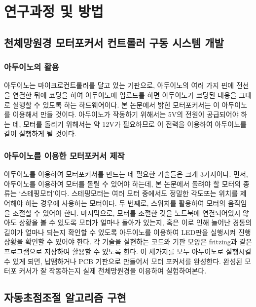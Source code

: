 \section{연구과정 및 방법}

\subsection{천체망원경 모터포커서 컨트롤러 구동 시스템 개발}

\subsubsection{아두이노의 활용}

 아두이노는 마이크로컨트롤러를 달고 있는 기판으로, 아두이노의 여러 가지 핀에 전선을 연결한 뒤에 코딩을 하여 아두이노에 업로드를 하면 아두이노가 코딩된 내용을 그대로 실행할 수 있도록 하는 하드웨어이다. 본 논문에서 밝힌 모터포커서는 이 아두이노를 이용해서 만들 것이다. 아두이노가 작동하기 위해서는 5V의 전원이 공급되어야 하는 데, 모터를 돌리기 위해서는 약 12V가 필요하므로 이 전력을 이용하여 아두이노를 같이 실행하게 될 것이다.
 
 \subsubsection{아두이노를 이용한 모터포커서 제작}
 
  아두이노를 이용하여 모터포커서를 만드는 데 필요한 기술들은 크게 3가지이다. 먼저, 아두이노를 이용하여 모터를 돌릴 수 있어야 하는데, 본 논문에서 돌려야 할 모터의 종류는 ‘스테핑모터’이다. 스테핑모터는 여러 모터 중에서도 정밀한 각도또는 위치를 제어해야 하는 경우에 사용하는 모터이다. 두 번째로, 스위치를 활용하여 모터의 움직임을 조절할 수 있어야 한다. 마지막으로, 모터를 조절한 것을 노트북에 연결되어있지 않아도 상황을 볼 수 있도록 모터가 얼마나 돌아가 있는지, 혹은 이로 인해 늘어난 경통의 길이가 얼마나 되는지 확인할 수 있도록 아두이노를 이용하여 LED판을 실행시켜 진행 상황을 확인할 수 있어야 한다. 각 기술을 실현하는 코드와 기판 모양은 fritzing과 같은 프로그램으로 저장하여 활용할 수 있도록 한다.
 이 세가지를 모두 아두이노로 실행시킬 수 있게 되면, 납땜하거나 PCB 기판으로 만들어서 모터 포커서를 완성한다. 완성된 모터포 커서가 잘 작동하는지 실제 천체망원경을 이용하여 실험하여본다.
 
 \subsection{자동초점조절 알고리즘 구현}
 
